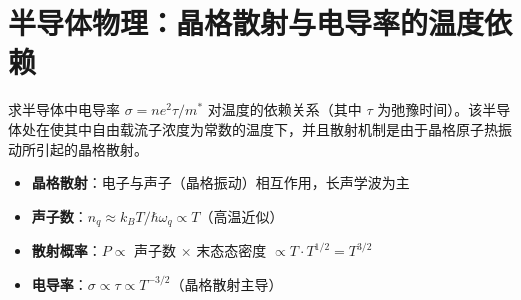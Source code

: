 \section{半导体物理：晶格散射与电导率的温度依赖}
\label{sec:lattice-scattering}

\begin{modelbox}[题目：晶格散射主导下的电导率温度关系]
求半导体中电导率 $\sigma=ne^2\tau/m^*$ 对温度的依赖关系（其中 $\tau$ 为弛豫时间）。该半导体处在使其中自由载流子浓度为常数的温度下，并且散射机制是由于晶格原子热振动所引起的晶格散射。
\end{modelbox}

\begin{tipbox}[考点快速分析]
\begin{itemize}
    \item \textbf{晶格散射}：电子与声子（晶格振动）相互作用，长声学波为主
    \item \textbf{声子数}：$n_q\approx k_BT/\hbar\omega_q\propto T$（高温近似）
    \item \textbf{散射概率}：$P\propto$ 声子数 $\times$ 末态态密度 $\propto T\cdot T^{1/2}=T^{3/2}$
    \item \textbf{电导率}：$\sigma\propto\tau\propto T^{-3/2}$（晶格散射主导）
\end{itemize}
\end{tipbox}


